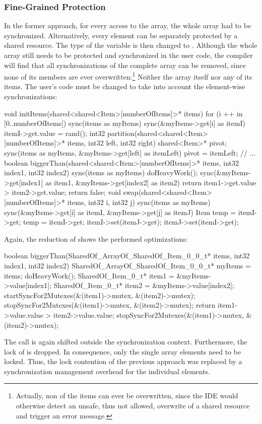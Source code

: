 \subsubsection{Fine-Grained Protection}
In the former approach, for every access to the array, the whole array had to be synchronized. Alternatively, every element can be separately protected by a shared resource. The type of the  variable is then changed to . Although the whole array still needs to be protected and synchronized in the user code, the compiler will find that all synchronizations of the complete array can be removed, since none of its members are ever overwritten:\footnote{Actually, non of the items can ever be overwritten, since the IDE would otherwise detect an unsafe, thus not allowed, overwrite of a shared resource and trigger an error message.} Neither the array itself nor any of its items. The user's code must be changed to take into account the element-wise synchronizations:
\begin{ccode}
void initItems(shared<shared<Item>[numberOfItems]>* items) { 
  for (i ++ in [0..numberOfItems[) { 
    sync(items as myItems) { 
      sync(&myItems->get[i] as itemI) { itemI->get.value = rand(); } 
    } 
  }
}
int32 partition(shared<shared<Item>[numberOfItems]>* items, int32 left, int32 right) { 
  shared<Item>* pivot; 
  sync(items as myItems, &myItems->get[left] as itemLeft) { pivot = itemLeft; } 
  // ...
}
boolean biggerThan(shared<shared<Item>[numberOfItems]>* items, int32 index1, int32 index2) { 
  sync(items as myItems) {
    doHeavyWork();  
    sync(&myItems->get[index1] as item1, &myItems->get[index2] as item2) { 
      return item1->get.value > item2->get.value; 
    } 
  } 
  return false; 
}
void swap(shared<shared<Item>[numberOfItems]>* items, int32 i, int32 j) { 
  sync(items as myItems) { 
    sync(&myItems->get[i] as itemI, &myItems->get[j] as itemJ) { 
      Item temp = itemI->get; 
      temp = itemI->get; 
      itemI->set(itemJ->get); 
      itemJ->set(itemI->get); 
    } 
  } 
}
\end{ccode}
Again, the reduction of  shows the performed optimizations:
\begin{ccode}
boolean biggerThan(SharedOf_ArrayOf_SharedOf_Item_0_0_t* items, int32 index1, int32 index2) {
  { 
    SharedOf_ArrayOf_SharedOf_Item_0_0_t* myItems = items; 
    { 
      doHeavyWork(); 
      { 
        SharedOf_Item_0_t* item1 = &myItems->value[index1]; 
        SharedOf_Item_0_t* item2 = &myItems->value[index2]; 
        startSyncFor2Mutexes(&(item1)->mutex, &(item2)->mutex); 
        { 
          stopSyncFor2Mutexes(&(item1)->mutex, &(item2)->mutex);  
          return item1->value.value > item2->value.value; 
        } 
        stopSyncFor2Mutexes(&(item1)->mutex, &(item2)->mutex); 
      } 
    } 
  }
}
\end{ccode}
The call  is again shifted outside the synchronization context. Furthermore, the lock of  is dropped. In consequence, only the single array elements need to be locked. Thus, the lock contention of the previous approach was replaced by a synchronization management overhead for the individual elements.

